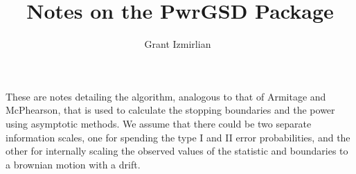 \documentclass{article}
\begin{document}
\title{{Notes on the PwrGSD Package}}

\author{{Grant Izmirlian}\footnotemark[1]~\footnotemark[2]}


\maketitle

These are notes detailing the algorithm, analogous to that of Armitage and McPhearson,
that is used to calculate the stopping boundaries and the power using asymptotic 
methods. We assume that there could be two separate information scales, one for spending
the type I and II error probabilities, and the other for internally scaling the observed
values of the statistic and boundaries to a brownian motion with a drift.
\end{document}
